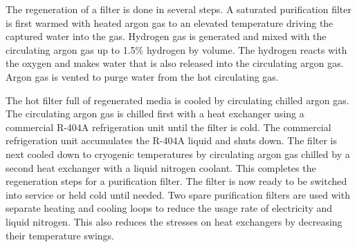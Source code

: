 The regeneration of a filter is done in several steps. A saturated purification filter is first warmed with heated argon gas to an elevated temperature driving the captured water into the gas. Hydrogen gas is generated and mixed with the circulating argon gas up to 1.5\% hydrogen by volume. The hydrogen reacts with the oxygen and makes water that is also released into the circulating argon gas.
Argon gas is vented to purge water from the hot circulating gas. 

The hot filter full of regenerated media is cooled by circulating chilled argon gas. The circulating argon gas is chilled first with a heat exchanger using a commercial R-404A refrigeration unit until the filter is cold. The commercial refrigeration unit accumulates the R-404A liquid and shuts down. The filter is next cooled down to cryogenic temperatures by circulating argon gas chilled by a second heat exchanger with a liquid nitrogen coolant. This completes the regeneration steps for a purification filter. The filter is now ready to be switched into service or held cold until needed. Two spare purification filters are used with separate heating and cooling loops to reduce the usage rate of electricity and liquid nitrogen. This also reduces the stresses on heat exchangers by decreasing their temperature swings.

